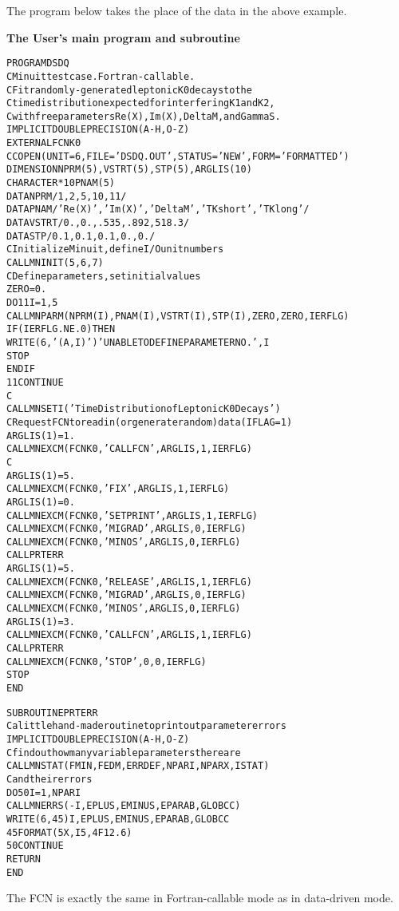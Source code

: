 The program below takes the place of
the data in the above example.

\begin{center}\small\textbf{The User's main program and subroutine}\end{center}

\begin{alltt}\footnotesize
      PROGRAM DSDQ
C             Minuit test case.  Fortran-callable.
C             Fit randomly-generated leptonic K0 decays to the
C       time distribution expected for interfering K1 and K2,
C       with free parameters Re(X), Im(X), DeltaM, and GammaS.
      IMPLICIT DOUBLE PRECISION (A-H,O-Z)
      EXTERNAL FCNK0
CC    OPEN (UNIT=6,FILE='DSDQ.OUT',STATUS='NEW',FORM='FORMATTED')
      DIMENSION NPRM(5),VSTRT(5),STP(5),ARGLIS(10)
      CHARACTER*10 PNAM(5)
      DATA NPRM /   1   ,    2   ,     5    ,   10     ,  11    /
      DATA PNAM /'Re(X)', 'Im(X)', 'Delta M','T Kshort','T Klong'/
      DATA VSTRT/   0.  ,    0.  ,    .535  ,   .892   ,  518.3 /
      DATA STP  /   0.1 ,    0.1 ,     0.1  ,     0.   ,   0.   /
C        Initialize Minuit, define I/O unit numbers
      CALL MNINIT(5,6,7)
C        Define parameters, set initial values
      ZERO = 0.
      DO 11  I= 1, 5
       CALL MNPARM(NPRM(I),PNAM(I),VSTRT(I),STP(I),ZERO,ZERO,IERFLG)
       IF (IERFLG .NE. 0)  THEN
          WRITE (6,'(A,I)')  ' UNABLE TO DEFINE PARAMETER NO.',I
          STOP
       ENDIF
   11 CONTINUE
C
      CALL MNSETI('Time Distribution of Leptonic K0 Decays')
C       Request FCN to read in (or generate random) data (IFLAG=1)
           ARGLIS(1) = 1.
      CALL MNEXCM(FCNK0, 'CALL FCN', ARGLIS ,1,IERFLG)
C
         ARGLIS(1) = 5.
      CALL MNEXCM(FCNK0,'FIX', ARGLIS ,1,IERFLG)
         ARGLIS(1) = 0.
      CALL MNEXCM(FCNK0,'SET PRINT', ARGLIS ,1,IERFLG)
      CALL MNEXCM(FCNK0,'MIGRAD', ARGLIS ,0,IERFLG)
      CALL MNEXCM(FCNK0,'MINOS', ARGLIS ,0,IERFLG)
         CALL PRTERR
         ARGLIS(1) = 5.
      CALL MNEXCM(FCNK0,'RELEASE', ARGLIS ,1,IERFLG)
      CALL MNEXCM(FCNK0,'MIGRAD', ARGLIS ,0,IERFLG)
      CALL MNEXCM(FCNK0,'MINOS', ARGLIS ,0,IERFLG)
         ARGLIS(1) = 3.
      CALL MNEXCM(FCNK0,'CALL FCN', ARGLIS , 1,IERFLG)
         CALL PRTERR
      CALL MNEXCM(FCNK0,'STOP ', 0,0,IERFLG)
      STOP
      END
 
      SUBROUTINE PRTERR
C   a little hand-made routine to print out parameter errors
      IMPLICIT DOUBLE PRECISION (A-H,O-Z)
C  find out how many variable parameters there are
      CALL MNSTAT(FMIN,FEDM,ERRDEF,NPARI,NPARX,ISTAT)
C   and their errors
      DO 50 I= 1, NPARI
      CALL MNERRS(-I,EPLUS,EMINUS,EPARAB,GLOBCC)
      WRITE (6,45) I,EPLUS,EMINUS,EPARAB,GLOBCC
   45 FORMAT (5X,I5,4F12.6)
   50 CONTINUE
      RETURN
      END
\end{alltt}

The FCN is exactly the same in Fortran-callable mode as in
data-driven mode.
